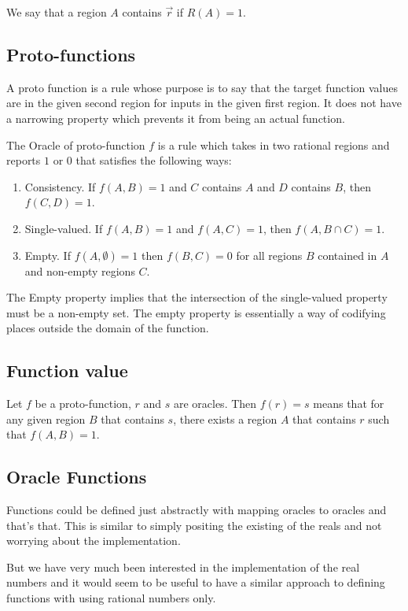 \documentclass[12pt]{article}
\theoremstyle{remark}
\begin{document}
We say that a region $A$ contains $\Vec{r}$ if $R(A) = 1$.


\subsection{Proto-functions}

A proto function is a rule whose purpose is to say that the target function values are in the given second region for inputs in the given first region. It does not have a narrowing property which prevents it from being an actual function. 

The Oracle of proto-function $f$ is a rule which takes in two rational regions and reports $1$ or $0$ that satisfies the following ways: 
\begin{enumerate}
    \item Consistency. If $f(A,B) = 1$ and $C$ contains $A$ and $D$ contains $B$, then $f(C,D) = 1$.
    \item Single-valued. If $f(A,B)=1$ and $f(A,C)=1$, then $f(A, B \cap C) = 1$. 
    \item Empty. If $f(A, \emptyset) = 1$ then $f(B, C) = 0$ for all regions $B$ contained in $A$ and non-empty regions $C$.
\end{enumerate}

The Empty property implies that the intersection of the single-valued property must be a non-empty set. The empty property is essentially a way of codifying places outside the domain of the function. 

\subsection{Function value}

Let $f$ be a proto-function, $r$ and $s$ are oracles. Then $f(r) = s$ means that for any given region $B$ that contains $s$, there exists a region $A$ that contains $r$ such that $f(A,B) = 1$.

\subsection{Oracle Functions}

Functions could be defined just abstractly with mapping oracles to oracles and that's that. This is similar to simply positing the existing of the reals and not worrying about the implementation. 

But we have very much been interested in the implementation of the real numbers and it would seem to be useful to have a similar approach to defining functions with using rational numbers only. 
\end{document}
